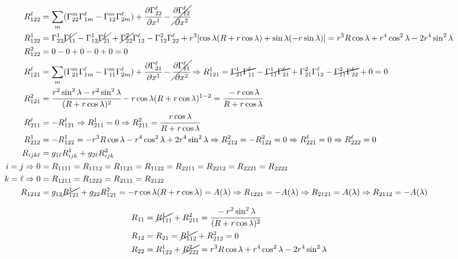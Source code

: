 \documentclass[10pt,a4paper]{article}
\begin{document}
\begin{align*}
		R_{122}^\ell &= \sum_m (\Gamma_{22}^m \Gamma_{1m}^\ell - \Gamma_{12}^m \Gamma_{2m}^\ell) + \cfrac{\partial \Gamma_{22}^\ell}{\partial x^1} - \cancel{\cfrac{\partial \Gamma_{12}^\ell}{\partial x^2}} \\
		R_{122}^1 &= \Gamma_{22}^1 \cancel{\Gamma_{11}^\ell} - \Gamma_{12}^1 \cancel{\Gamma_{21}^\ell} + \cancel{\Gamma_{22}^2} \Gamma_{12}^\ell - \Gamma_{12}^2 \Gamma_{22}^\ell + r^3 [ \cos \lambda (R + r \cos \lambda) + \sin \lambda (-r \sin \lambda) ] = r^3 R \cos \lambda + r^4 \cos^2 \lambda - 2 r^4 \sin^2 \lambda \\
		R_{122}^2 &= 0 - 0 + 0 - 0 + 0 = 0 \\
		R_{121}^\ell &= \sum_m (\Gamma_{21}^m \Gamma_{1m}^\ell - \Gamma_{11}^m \Gamma_{2m}^\ell) + \cfrac{\partial \Gamma_{21}^\ell}{\partial x^1} - \cancel{\cfrac{\partial \Gamma_{11}^\ell}{\partial x^2}} \Rightarrow R_{121}^1 = \cancel{\Gamma_{21}^1 \Gamma_{11}^\ell} - \cancel{\Gamma_{11}^1 \Gamma_{21}^\ell} + \Gamma_{21}^2 \Gamma_{12}^\ell - \cancel{\Gamma_{11}^2 \Gamma_{22}^\ell} + 0 = 0 \\
		R_{121}^2 &= \cfrac{r^2 \sin^2 \lambda - r^2 \sin^2 \lambda}{(R + r \cos \lambda)^2} - r \cos \lambda (R + r \cos \lambda)^{1 - 2} = \cfrac{-r \cos \lambda}{R + r \cos \lambda} \\
		R_{211}^\ell &= - R_{121}^\ell \Rightarrow R_{211}^1 = 0 \Rightarrow R_{211}^2 = \cfrac{r \cos \lambda}{R + r \cos \lambda} \\
		R_{212}^1 &= - R_{122}^1 = - r^3 R \cos \lambda - r^4 \cos^2 \lambda + 2 r^4 \sin^2 \lambda \Rightarrow R_{212}^2 = - R_{122}^2 = 0 \Rightarrow R_{221}^\ell = 0 \Rightarrow R_{222}^\ell = 0 \\
		R_{ijk\ell} &= g_{1\ell} R_{ijk}^1 + g_{2\ell} R_{ijk}^2 \\
		i = j \Rightarrow 0 &= R_{1111} = R_{1112} = R_{1121} = R_{1122} = R_{2211} = R_{2212} = R_{2221} = R_{2222} \\
		k = \ell \Rightarrow 0 &= R_{1211} = R_{1222} = R_{2111} = R_{2122} \\
		R_{1212} &= g_{12} \cancel{R_{121}^1} + g_{22} R_{121}^2 = - r \cos \lambda (R + r \cos \lambda) = A(\lambda) \Rightarrow R_{1221} = - A(\lambda) \Rightarrow R_{2121} = A(\lambda) \Rightarrow R_{2112} = - A(\lambda)
		\end{align*}

		\begin{align*}
		R_{11} &= \cancel{R_{111}^1} + R_{211}^2 = \cfrac{-r^2 \sin^2 \lambda}{(R + r \cos \lambda)^2} \\
		R_{12} &= R_{21} = \cancel{R_{112}^1} + R_{212}^2 = 0 \\
		R_{22} &= R_{122}^1 + \cancel{R_{222}^2} = r^3 R \cos \lambda + r^4 \cos^2 \lambda - 2 r^4 \sin^2 \lambda
		\end{align*}
\end{document}

